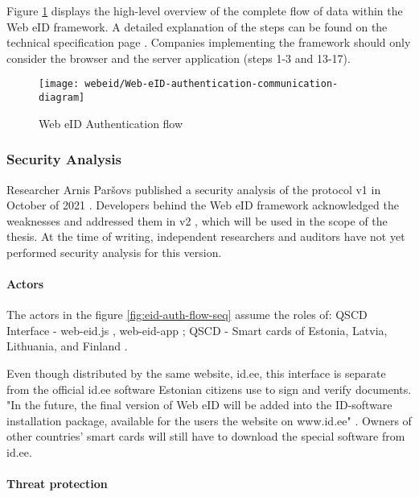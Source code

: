 Figure \ref{fig:web-eid-authentication} displays the high-level overview of the complete flow of data within the Web eID framework. A detailed explanation of the steps can be found on the technical specification page \cite{ria-webeid-systemarchitecture}. Companies implementing the framework should only consider the browser and the server application (steps 1-3 and 13-17).

\begin{figure}
  \centering
  \texttt{[image: webeid/Web-eID-authentication-communication-diagram]}
  \caption{Web eID Authentication flow \cite{ria-webeid-systemarchitecture}}
  \label{fig:web-eid-authentication}
\end{figure}


\subsubsection{Security Analysis}

Researcher Arnis Paršovs published a security analysis of the protocol v1 in October of 2021 \cite{arnis-report-webeid}. Developers behind the Web eID framework acknowledged the weaknesses and addressed them in v2 \cite{ria-webeid-systemarchitecture}, which will be used in the scope of the thesis. At the time of writing, independent researchers and auditors have not yet performed security analysis for this version.

\paragraph{Actors}

The actors in the figure \ref{fig:eid-auth-flow-seq} assume the roles of: QSCD Interface - web-eid.js \cite{ria-webeid-source-web-eid-js}, web-eid-app \cite{ria-webeid-source-web-eid-app}; QSCD - Smart cards of Estonia, Latvia, Lithuania, and Finland \cite{ria-webeid}. 

Even though distributed by the same website, id.ee, this interface is separate from the official id.ee software Estonian citizens use to sign and verify documents. "In the future, the final version of Web eID will be added into the ID-software installation package, available for the users the website on www.id.ee" \cite{ria-webeid}. Owners of other countries' smart cards will still have to download the special software from id.ee.

\paragraph{Threat protection}

